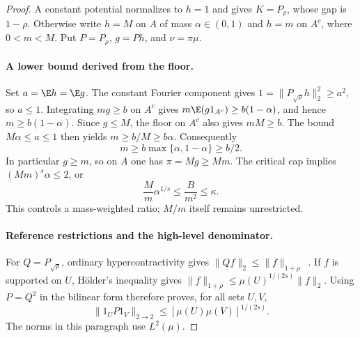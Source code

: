 \begin{proof}
A constant potential normalizes to $h=1$ and gives $K=P_\rho$, whose gap is
$1-\rho$. Otherwise write $h=M$ on $A$ of mass $\alpha\in(0,1)$ and $h=m$
on $A^c$, where $0<m<M$. Put $P=P_\rho$, $g=Ph$, and $\nu=\pi\mu$.

\paragraph{A lower bound derived from the floor.}
Set $a=\E h=\E g$. The constant Fourier component gives
$1=\|P_{\sqrt\rho}h\|_2^2\geq a^2$, so $a\leq1$.
Integrating $mg\geq b$ on $A^c$ gives
$m\E(g1_{A^c})\geq b(1-\alpha)$, and hence $m\geq b(1-\alpha)$.
Since $g\leq M$, the floor on $A^c$ also gives $mM\geq b$.
The bound $M\alpha\leq a\leq1$ then yields $m\geq b/M\geq b\alpha$.
Consequently
\begin{equation}\label{twolevelminimum}
 m\geq b\max\{\alpha,1-\alpha\}\geq b/2.
\end{equation}
In particular $g\geq m$, so on $A$ one has $\pi=Mg\geq Mm$.
The critical cap implies $(Mm)^s\alpha\leq2$, or
\begin{equation}\label{twolevelbalance}
 \frac M m\alpha^{1/s}\leq\frac B{m^2}\leq\kappa.
\end{equation}
This controls a mass-weighted ratio; $M/m$ itself remains unrestricted.

\paragraph{Reference restrictions and the high-level denominator.}
For $Q=P_{\sqrt\rho}$, ordinary hypercontractivity gives
$\|Qf\|_2\leq\|f\|_{1+\rho}$~\cite{odonnelllecture}.
If $f$ is supported on $U$, H\"older's inequality gives
$\|f\|_{1+\rho}\leq\mu(U)^{1/(2s)}\|f\|_2$.
Using $P=Q^2$ in the bilinear form therefore proves, for all sets $U,V$,
\begin{equation}\label{twolevelrestriction}
 \|1_U P1_V\|_{2\to2}\leq[\mu(U)\mu(V)]^{1/(2s)}.
\end{equation}
The norms in this paragraph use $L^2(\mu)$.


\end{proof}
